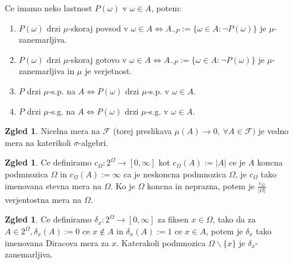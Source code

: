 \documentclass[a4paper,12pt]{article}
\theoremstyle{definition} %
\newtheorem{zgled}[definicija]{Zgled}
\theoremstyle{plain} %
\newcommand{\F}{\mathcal{F}}
\begin{document}
            Ce imamo neko lastnost $P(\omega)$ v $\omega \in A$, potem: 
            \begin{enumerate}
                \item $P(\omega)$ drzi $\mu$-skoraj povsod v $\omega \in A \iff A_{\neg P} := \{\omega \in A: \neg P(\omega)\}$ je $\mu$-zanemarljiva.       
                \item $P(\omega)$ drzi $\mu$-skoraj gotovo v $\omega \in A \iff A_{\neg P} := \{\omega \in A: \neg P(\omega)\}$ je $\mu$-zanemarljiva in $\mu$ je verjetnost.
                \item $P$ drzi $\mu$-s.p. na $A \iff P(\omega)$ drzi $\mu$-s.p. v $\omega \in A$. 
                \item $P$ drzi $\mu$-s.g. na $A \iff P(\omega)$ drzi $\mu$-s.g. v $\omega \in A$. 
            \end{enumerate}
            \begin{zgled}
                Nicelna mera na $\F$ (torej preslikava $\mu(A) \rightarrow 0, \ \forall A \in \F)$ je vedno mera na katerikoli $\sigma$-algebri.
            \end{zgled}      
            
            \begin{zgled}
                Ce definiramo $c_\Omega:2^\Omega \rightarrow [0, \infty]$ kot $c_\Omega(A) := |A|$ ce je $A$ koncna podmnozica $\Omega$ in $c_\Omega(A) := \infty$ ca je neskoncna podmnozica $\Omega$, je $c_\Omega$ tako imenovana stevna mera na $\Omega$. Ko je $\Omega$ koncna in neprazna, potem je $\frac{c_\Omega}{|\Omega|}$ verjentostna mera na $\Omega$.  
            \end{zgled}

            \begin{zgled}
                Ce definiramo $\delta_x:2^\Omega \rightarrow [0, \infty]$ za fiksen $x \in \Omega$, tako da za $A \in 2^\Omega, \delta_x(A):=0$ ce $x \notin A$ in $\delta_x(A):=1$ ce $x \in A$, potem je $\delta_x$ tako imenovana Diracova mera za $x$. Katerakoli podmnozica $\Omega \backslash \{x\}$ je $\delta_x$-zanemarljiva.                
            \end{zgled}
            
\end{document}
